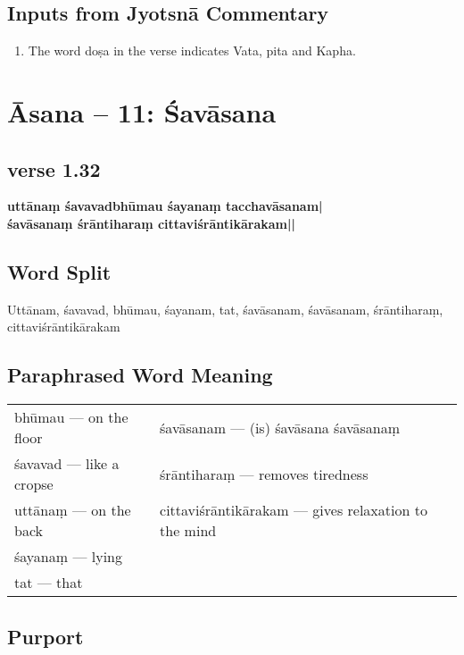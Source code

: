 \subsection*{Inputs from Jyotsnā Commentary}

\begin{enumerate}
\item The word doṣa in the verse indicates Vata, pita and Kapha.
\end{enumerate}
\newpage

\section*{Āsana -- 11: Śavāsana}

\subsection*{verse 1.32}

\begin{shloka}
\textbf{uttānaṃ śavavadbhūmau śayanaṃ tacchavāsanam|}\\
\textbf{śavāsanaṃ śrāntiharaṃ cittaviśrāntikārakam||}
\end{shloka}

\subsection*{Word Split}

Uttānam, śavavad, bhūmau, śayanam, tat, śavāsanam, śavāsanam, śrāntiharaṃ, cittaviśrāntikārakam

\subsection*{Paraphrased Word Meaning}

\begin{longtable}{>{\noindent\raggedright}p{5cm}>{\noindent\raggedright}p{5cm}}
bhūmau --- on the floor  & śavāsanam --- (is) śavāsana śavāsanaṃ\tabularnewline
śavavad  --- like a cropse  & śrāntiharaṃ --- removes tiredness\tabularnewline
uttānaṃ --- on the back  & cittaviśrāntikārakam --- gives relaxation to the mind\tabularnewline
śayanaṃ --- lying  & \tabularnewline
tat --- that  & 
\end{longtable}

\subsection*{Purport}

